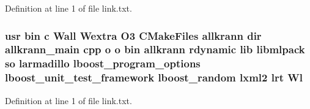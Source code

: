 Definition at line 1 of file link.\-txt.

\subsubsection[{Wl}]{\setlength{\rightskip}{0pt plus 5cm}usr bin c Wall Wextra O3 C\-Make\-Files allkrann dir allkrann\-\_\-main cpp o o bin allkrann rdynamic lib libmlpack so larmadillo lboost\-\_\-program\-\_\-options lboost\-\_\-unit\-\_\-test\-\_\-framework lboost\-\_\-random lxml2 lrt Wl}\label{methods_2rann_2CMakeFiles_2allkrann_8dir_2link_8txt_ac2b1e8ca932319e9d9693d0961cfcfac}


Definition at line 1 of file link.\-txt.

